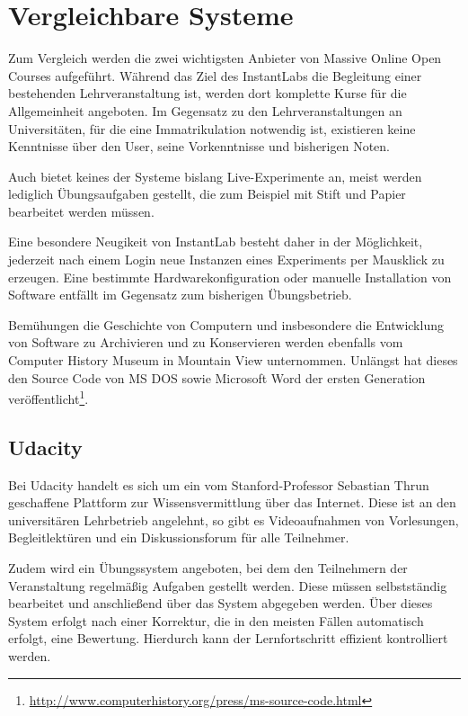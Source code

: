 \section{Vergleichbare Systeme}
\label{sec:solutions}
		


	Zum Vergleich werden die zwei wichtigsten Anbieter von Massive Online Open Courses aufgeführt. 
	Während das Ziel des InstantLabs die Begleitung einer bestehenden Lehrveranstaltung ist, werden dort komplette Kurse für die Allgemeinheit angeboten. 
	Im Gegensatz zu den Lehrveranstaltungen an Universitäten, für die eine Immatrikulation notwendig ist, existieren keine Kenntnisse über den User, seine Vorkenntnisse und bisherigen Noten. 

	Auch bietet keines der Systeme bislang Live-Experimente an, meist werden lediglich Übungsaufgaben gestellt, die zum Beispiel mit Stift und Papier bearbeitet werden müssen. 

	Eine besondere Neugikeit von InstantLab besteht daher in der Möglichkeit, jederzeit nach einem Login neue Instanzen eines Experiments per Mausklick zu erzeugen. 
	Eine bestimmte Hardwarekonfiguration oder manuelle Installation von Software entfällt im Gegensatz zum bisherigen Übungsbetrieb.
		
	Bemühungen die Geschichte von Computern und insbesondere die Entwicklung von Software zu Archivieren und zu Konservieren werden ebenfalls vom Computer History Museum in Mountain View unternommen.
	Unlängst hat dieses den Source Code von MS DOS sowie Microsoft Word der ersten Generation veröffentlicht\footnote{\url{http://www.computerhistory.org/press/ms-source-code.html}}.

		\subsection{Udacity}

			Bei Udacity handelt es sich um ein vom Stanford-Professor Sebastian Thrun geschaffene Plattform zur Wissensvermittlung über das Internet.
			Diese ist an den universitären Lehrbetrieb angelehnt, so gibt es Videoaufnahmen von Vorlesungen, Begleitlektüren und ein Diskussionsforum für alle Teilnehmer. 


			Zudem wird ein Übungssystem angeboten, bei dem den Teilnehmern der Veranstaltung regelmäßig Aufgaben gestellt werden. Diese müssen selbstständig bearbeitet und anschließend über das System abgegeben werden.
			Über dieses System erfolgt nach einer Korrektur, die in den meisten Fällen automatisch erfolgt, eine Bewertung.
			Hierdurch kann der Lernfortschritt effizient kontrolliert werden. %

